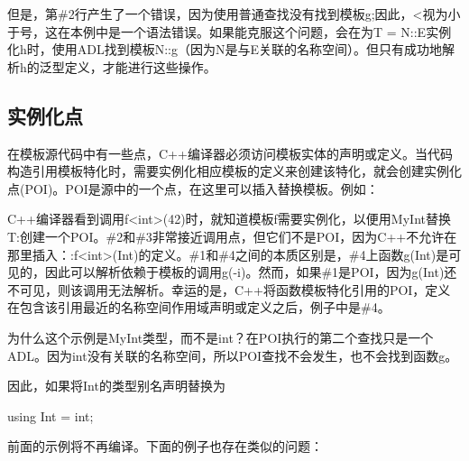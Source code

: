 但是，第\#2行产生了一个错误，因为使用普通查找没有找到模板g;因此，<视为小于号，这在本例中是一个语法错误。如果能克服这个问题，会在为T = N::E实例化h时，使用ADL找到模板N::g（因为N是与E关联的名称空间）。但只有成功地解析h的泛型定义，才能进行这些操作。

\subsection{实例化点}

在模板源代码中有一些点，C++编译器必须访问模板实体的声明或定义。当代码构造引用模板特化时，需要实例化相应模板的定义来创建该特化，就会创建实例化点(POI)。POI是源中的一个点，在这里可以插入替换模板。例如：


C++编译器看到调用f<int>(42)时，就知道模板f需要实例化，以便用MyInt替换T:创建一个POI。\#2和\#3非常接近调用点，但它们不是POI，因为C++不允许在那里插入：:f<int>(Int)的定义。\#1和\#4之间的本质区别是，\#4上函数g(Int)是可见的，因此可以解析依赖于模板的调用g(-i)。然而，如果\#1是POI，因为g(Int)还不可见，则该调用无法解析。幸运的是，C++将函数模板特化引用的POI，定义在包含该引用最近的名称空间作用域声明或定义之后，例子中是\#4。

为什么这个示例是MyInt类型，而不是int？在POI执行的第二个查找只是一个ADL。因为int没有关联的名称空间，所以POI查找不会发生，也不会找到函数g。

因此，如果将Int的类型别名声明替换为

\begin{cpp}
using Int = int;
\end{cpp}

前面的示例将不再编译。下面的例子也存在类似的问题：


